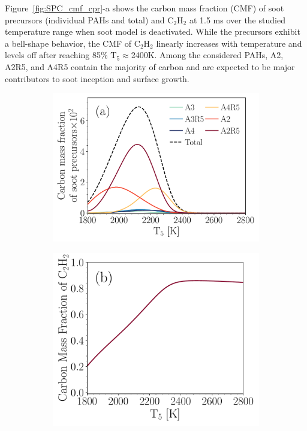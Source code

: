 
Figure~\ref{fig:SPC_cmf_cpr}-a shows the carbon mass fraction (CMF) of soot precursors (individual PAHs and total) and $\mathrm{C_2H_2}$ at 1.5 ms over the studied temperature range when soot model is deactivated. While the precursors exhibit a bell-shape behavior, the CMF of $\mathrm{C_2H_2}$ linearly increases with temperature and levels off after reaching 85\% $\mathrm{T_5\approx}$2400K. Among the considered PAHs, A2, A2R5, and A4R5 contain the majority of carbon and are expected to be major contributors to soot inception and surface growth.

\begin{figure}[H]
	\centering
	\begin{subfigure}[t]{0.4\textwidth}
		\includegraphics[width=1\textwidth]{Figures/Results/Shocktube/Agafonov2016_cpr/SPC_cmf_separate.pdf}
	\end{subfigure}
	\begin{subfigure}[t]{0.36\textwidth}
		\includegraphics[width=1\textwidth]{Figures/Results/Shocktube/Agafonov2016_cpr/C2H2_cmf.pdf}

\end{subfigure}
\end{figure}
